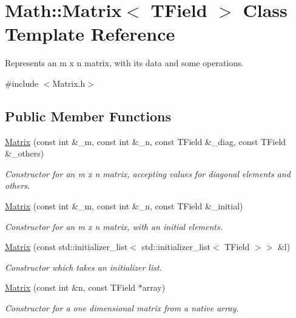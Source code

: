 \hypertarget{classMath_1_1Matrix}{}\section{Math\+:\+:Matrix$<$ T\+Field $>$ Class Template Reference}
\label{classMath_1_1Matrix}


Represents an m x n matrix, with its data and some operations.  




{\ttfamily \#include $<$Matrix.\+h$>$}

\subsection*{Public Member Functions}
\begin{DoxyCompactItemize}
\item 
\mbox{\hyperlink{classMath_1_1Matrix_a15145cfc26ef1fd2f68e4a4489490e30}{Matrix}} (const int \&\+\_\+m, const int \&\+\_\+n, const T\+Field \&\+\_\+diag, const T\+Field \&\+\_\+others)
\begin{DoxyCompactList}\small\item\em Constructor for an m x n matrix, accepting values for diagonal elements and others. \end{DoxyCompactList}\item 
\mbox{\hyperlink{classMath_1_1Matrix_ae0d9fbd3225b9b3d50f7b42de14cead6}{Matrix}} (const int \&\+\_\+m, const int \&\+\_\+n, const T\+Field \&\+\_\+initial)
\begin{DoxyCompactList}\small\item\em Constructor for an m x n matrix, with an initial elements. \end{DoxyCompactList}\item 
\mbox{\hyperlink{classMath_1_1Matrix_a3e7c39f3d5951f365f687341cfb0feef}{Matrix}} (const std\+::initializer\+\_\+list$<$ std\+::initializer\+\_\+list$<$ T\+Field $>$$>$ \&l)
\begin{DoxyCompactList}\small\item\em Constructor which takes an initializer list. \end{DoxyCompactList}\item 
\mbox{\hyperlink{classMath_1_1Matrix_a2b849f680fc4ba0d5b0277f1b3116b81}{Matrix}} (const int \&n, const T\+Field $\ast$array)
\begin{DoxyCompactList}\small\item\em Constructor for a one dimensional matrix from a native array. \end{DoxyCompactList}\item 
$$
\end{DoxyCompactItemize}
